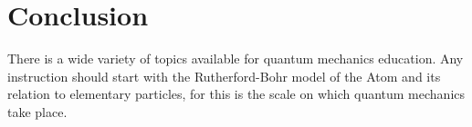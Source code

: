 \documentclass[11pt,twoside]{report} %
\begin{document}
\section{Conclusion}

There is a wide variety of topics available for quantum mechanics education. Any instruction should start with the Rutherford-Bohr model of the Atom and its relation to elementary particles, for this is the scale on which quantum mechanics take place. 



\end{document}
